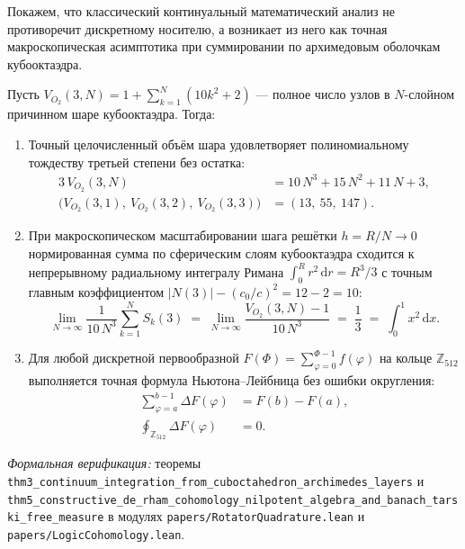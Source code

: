 Покажем, что классический континуальный математический анализ не противоречит дискретному носителю, а возникает из него как точная макроскопическая асимптотика при суммировании по архимедовым оболочкам кубооктаэдра.

\begin{theorem}[Рождение непрерывного интеграла Римана из слоёв кубооктаэдра $S_k(3) = 10k^2 + 2$]
\label{thm:mono-riemann-emergence}
Пусть $V_{O_2}(3, N) = 1 + \sum_{k=1}^{N} (10k^2 + 2)$ --- полное число узлов в $N$-слойном причинном шаре кубооктаэдра. Тогда:
\begin{enumerate}[label=\textbf{\arabic*.},noitemsep]
\item Точный целочисленный объём шара удовлетворяет полиномиальному тождеству третьей степени без остатка:
  \begin{align}
    3\,V_{O_2}(3, N) &= 10\,N^3 + 15\,N^2 + 11\,N + 3, \label{eq:mono-ball-polynomial} \\
    \bigl(V_{O_2}(3,1),\ V_{O_2}(3,2),\ V_{O_2}(3,3)\bigr) &= (13,\ 55,\ 147). \label{eq:mono-ball-123}
  \end{align}
\item При макроскопическом масштабировании шага решётки $h = R / N \to 0$ нормированная сумма по сферическим слоям кубооктаэдра сходится к непрерывному радиальному интегралу Римана $\int_0^R r^2\,\mathrm{d}r = R^3 / 3$ с точным главным коэффициентом $|N(3)| - (c_0/c)^2 = 12 - 2 = 10$:
  \begin{equation}
    \label{eq:mono-archimedes-limit}
    \lim_{N \to \infty} \frac{1}{10\,N^3} \sum_{k=1}^{N} S_k(3) \;=\; \lim_{N \to \infty} \frac{V_{O_2}(3, N) - 1}{10\,N^3} \;=\; \frac{1}{3} \;=\; \int_0^1 x^2\,\mathrm{d}x.
  \end{equation}
\item Для любой дискретной первообразной $F(\Phi) = \sum_{\varphi=0}^{\Phi-1} f(\varphi)$ на кольце $\mathbb{Z}_{512}$ выполняется точная формула Ньютона--Лейбница без ошибки округления:
  \begin{align}
    \sum_{\varphi=a}^{b-1} \Delta F(\varphi) &= F(b) - F(a), \label{eq:mono-newton-leibniz} \\
    \oint_{\mathbb{Z}_{512}} \Delta F(\varphi) &= 0. \label{eq:mono-newton-leibniz-loop}
  \end{align}
\end{enumerate}
\emph{Формальная верификация:} теоремы \texttt{thm3\_\allowbreak continuum\_\allowbreak integration\_\allowbreak from\_\allowbreak cuboctahedron\_\allowbreak archimedes\_\allowbreak layers} и \texttt{thm5\_\allowbreak constructive\_\allowbreak de\_\allowbreak rham\_\allowbreak cohomology\_\allowbreak nilpotent\_\allowbreak algebra\_\allowbreak and\_\allowbreak banach\_\allowbreak tarski\_\allowbreak free\_\allowbreak measure} в модулях \texttt{papers/\allowbreak Rotator\allowbreak Quadrature.lean} и \texttt{papers/\allowbreak Logic\allowbreak Cohomology.lean}.
\end{theorem}

